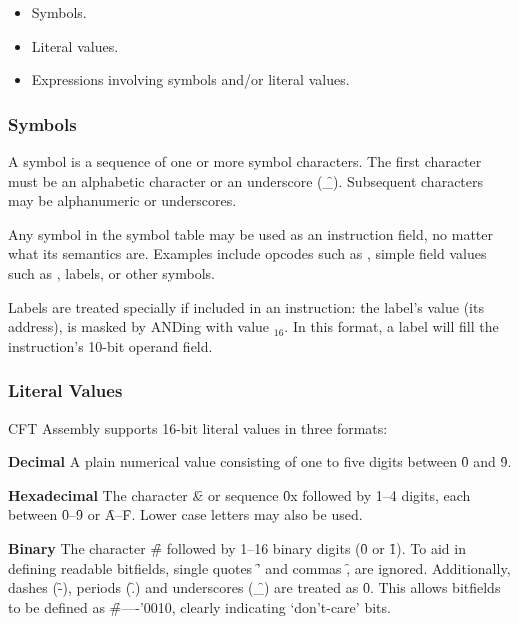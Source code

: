 \begin{itemize}
  \item Symbols.
  \item Literal values.
  \item Expressions involving symbols and/or literal values.
\end{itemize}

\subsubsection{Symbols}

A symbol is a sequence of one or more symbol characters. The first character
must be an alphabetic character or an underscore (\f{\_}). Subsequent characters
may be alphanumeric or underscores.

Any symbol in the symbol table may be used as an instruction field, no matter
what its semantics are. Examples include opcodes such as , simple
field values such as , labels, or other symbols.

Labels are treated specially if included in an instruction: the label's value (its
address), is masked by ANDing with value $_{16}$. In this format, a label
will fill the instruction's 10-bit operand field.

\subsubsection{Literal Values}

CFT Assembly supports 16-bit literal values in three formats:

\begin{description}
\item{\bfseries Decimal} A plain numerical value consisting of one to five digits
  between \f{0} and \f{9}.
\item{\bfseries Hexadecimal} The character \f{\&} or sequence \f{0x} followed by 1–4 digits,
  each between \f{0}–\f{9} or \f{A}–\f{F}. Lower case letters may also be used.
\item{\bfseries Binary} The character \f{\#} followed by 1–16 binary digits (\f{0} or
  \f{1}). To aid in defining readable bitfields, single quotes \f{'} and commas
  \f{,} are ignored. Additionally, dashes (\f{-}), periods (\f{.}) and
  underscores (\f{\_}) are treated as \f{0}. This allows bitfields to be
  defined as \f{\#----'0010}, clearly indicating ‘don't-care’ bits.
\end{description}

